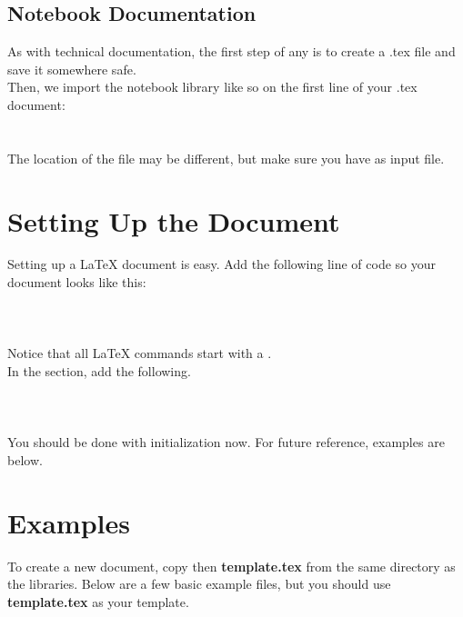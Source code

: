 \subsection{Notebook Documentation}
As with technical documentation, the first step of any is to create a .tex file and save it somewhere safe.\\
Then, we import the notebook library like so on the first line of your .tex document:\\\\ \\ The location of the file may be different, but make sure you have  as input file.

\section{Setting Up the Document}
Setting up a \LaTeX{} document is easy.  Add the following line of code so your document looks like this: \\\\\\\\  Notice that all \LaTeX{} commands start with a \code{\sla}.\pagebreak
\\In the  section, add the following.
\\\\\\\\
You should be done with initialization now.  For future reference, examples are below.

\section{Examples}
To create a new document, copy then  \textbf{template.tex} from the same directory as the libraries.  Below are a few basic example files, but you should use \textbf{template.tex} as your template.
